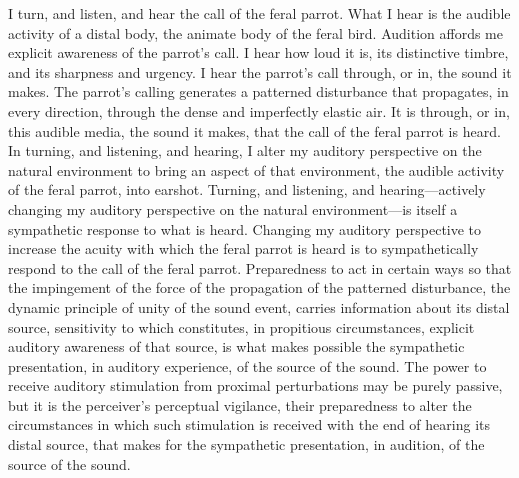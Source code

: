 I turn, and listen, and hear the call of the feral parrot. What I hear is the audible activity of a distal body, the animate body of the feral bird. Audition affords me explicit awareness of the parrot's call. I hear how loud it is, its distinctive timbre, and its sharpness and urgency. I hear the parrot's call through, or in, the sound it makes. The parrot's calling generates a patterned disturbance that propagates, in every direction, through the dense and imperfectly elastic air. It is through, or in, this audible media, the sound it makes, that the call of the feral parrot is heard. In turning, and listening, and hearing, I alter my auditory perspective on the natural environment to bring an aspect of that environment, the audible activity of the feral parrot, into earshot. Turning, and listening, and hearing---actively changing my auditory perspective on the natural environment---is itself a sympathetic response to what is heard. Changing my auditory perspective to increase the acuity with which the feral parrot is heard is to sympathetically respond to the call of the feral parrot. Preparedness to act in certain ways so that the impingement of the force of the propagation of the patterned disturbance, the dynamic principle of unity of the sound event, carries information about its distal source, sensitivity to which constitutes, in propitious circumstances, explicit auditory awareness of that source, is what makes possible the sympathetic presentation, in auditory experience, of the source of the sound. The power to receive auditory stimulation from proximal perturbations may be purely passive, but it is the perceiver's perceptual vigilance, their preparedness to alter the circumstances in which such stimulation is received with the end of hearing its distal source, that makes for the sympathetic presentation, in audition, of the source of the sound.


